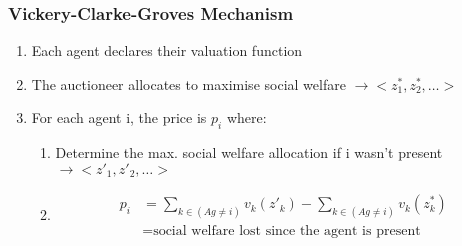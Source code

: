 \subsubsection{Vickery-Clarke-Groves Mechanism}
\begin{enumerate}
    \item Each agent declares their valuation function
    \item The auctioneer allocates to maximise social welfare $\rightarrow{<z^*_1,z^*_2,\dots>}$
    \item For each agent i, the price is $p_i$ where:
    \begin{enumerate}
        \item Determine the max. social welfare allocation if i wasn't present  $\rightarrow{<z'_1,z'_2,\dots>}$
        \item \begin{align*}
                p_i &= \sum_{k\in (Ag\neq i)}v_k(z'_k) - \sum_{k\in (Ag\neq i)}v_k(z^*_k) \\
                    &= \text{social welfare lost since the agent is present}
            \end{align*} 
    \end{enumerate}
\end{enumerate}

